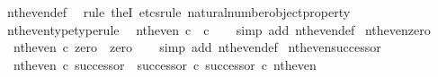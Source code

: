 \begin{isabellebody}
\isamarkupfalse%
\ nth{\isacharunderscore}{\kern0pt}even{\isacharunderscore}{\kern0pt}def\ \isamarkupfalse%
\ {\isacharparenleft}{\kern0pt}rule\ theI{\isacharprime}{\kern0pt}{\isacharcomma}{\kern0pt}\ etcs{\isacharunderscore}{\kern0pt}rule\ natural{\isacharunderscore}{\kern0pt}number{\isacharunderscore}{\kern0pt}object{\isacharunderscore}{\kern0pt}property{}{\isacharparenright}{\kern0pt}%
\endisatagproof
{\isafoldproof}%
%
\isadelimproof
\isanewline
%
\endisadelimproof
\isanewline
{}\isamarkupfalse%
\ nth{\isacharunderscore}{\kern0pt}even{\isacharunderscore}{\kern0pt}type{\isacharbrackleft}{\kern0pt}type{\isacharunderscore}{\kern0pt}rule{\isacharbrackright}{\kern0pt}{\isacharcolon}{\kern0pt}\isanewline
\ \ {\isachardoublequoteopen}nth{\isacharunderscore}{\kern0pt}even{\isacharcolon}{\kern0pt}\ {\isasymnat}\isactrlsub c\ {\isasymrightarrow}\ {\isasymnat}\isactrlsub c{\isachardoublequoteclose}\isanewline
%
\isadelimproof
\ \ %
\endisadelimproof
%
\isatagproof
{}\isamarkupfalse%
\ {\isacharparenleft}{\kern0pt}simp\ add{\isacharcolon}{\kern0pt}\ nth{\isacharunderscore}{\kern0pt}even{\isacharunderscore}{\kern0pt}def{}{\isacharparenright}{\kern0pt}%
\endisatagproof
{\isafoldproof}%
%
\isadelimproof
\isanewline
%
\endisadelimproof
\isanewline
{}\isamarkupfalse%
\ nth{\isacharunderscore}{\kern0pt}even{\isacharunderscore}{\kern0pt}zero{\isacharcolon}{\kern0pt}\isanewline
\ \ {\isachardoublequoteopen}nth{\isacharunderscore}{\kern0pt}even\ {\isasymcirc}\isactrlsub c\ zero\ {\isacharequal}{\kern0pt}\ zero{\isachardoublequoteclose}\isanewline
%
\isadelimproof
\ \ %
\endisadelimproof
%
\isatagproof
{}\isamarkupfalse%
\ {\isacharparenleft}{\kern0pt}simp\ add{\isacharcolon}{\kern0pt}\ nth{\isacharunderscore}{\kern0pt}even{\isacharunderscore}{\kern0pt}def{}{\isacharparenright}{\kern0pt}%
\endisatagproof
{\isafoldproof}%
%
\isadelimproof
\isanewline
%
\endisadelimproof
\isanewline
{}\isamarkupfalse%
\ nth{\isacharunderscore}{\kern0pt}even{\isacharunderscore}{\kern0pt}successor{\isacharcolon}{\kern0pt}\isanewline
\ \ {\isachardoublequoteopen}nth{\isacharunderscore}{\kern0pt}even\ {\isasymcirc}\isactrlsub c\ successor\ {\isacharequal}{\kern0pt}\ {\isacharparenleft}{\kern0pt}successor\ {\isasymcirc}\isactrlsub c\ successor{\isacharparenright}{\kern0pt}\ {\isasymcirc}\isactrlsub c\ nth{\isacharunderscore}{\kern0pt}even{\isachardoublequoteclose}\isanewline
%
\isadelimproof
\ \ %
\endisadelimproof
%
\isatagproof
{}\isamarkupfalse%

\end{isabellebody}
